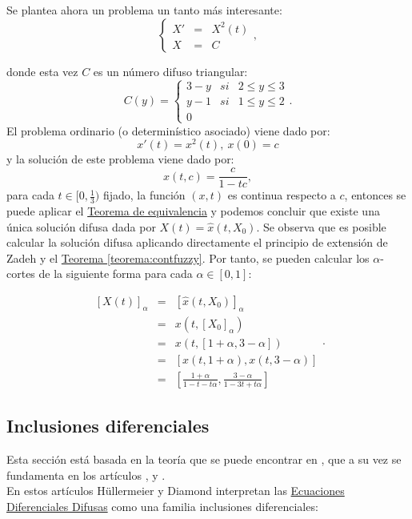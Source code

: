 \begin{ejemplo}
	Se plantea ahora un problema un tanto más interesante:
	\[
		\left\{
			\begin{array}{ccc}
				X' & = & X^2(t) \\
				X & =  & C
			\end{array}
		\right.,
	\]
	
	donde esta vez $C$ es un número difuso triangular:
	\[
		C(y) = \left\{
			\begin{array}{ccc}
				3 - y & si & 2 \leq y \leq 3 \\
				y - 1 & si & 1 \leq y \leq 2 \\
				0 
			\end{array}
		\right. .
	\]
	El problema ordinario (o determinístico asociado) viene dado por:
	\[
		x'(t) = x^2(t), ~ x(0) = c
	\]
	y la solución de este problema viene dado por:
	\[
		x(t, c) = \frac{c}{1-tc},
	\]
	para cada $t \in [0, \frac{1}{3})$ fijado, la función $(x, t)$ es continua respecto a $c$, entonces se puede aplicar el \hyperref[teorema:equivalencia]{Teorema de equivalencia} y podemos concluir que existe una única solución difusa dada por $X(t) = \hat{x}(t, X_0)$. Se observa que es posible calcular la solución difusa aplicando directamente el principio de extensión de Zadeh y el \hyperref[teorema:contfuzzy]{Teorema \ref*{teorema:contfuzzy}}. Por tanto, se pueden calcular los $\alpha$-cortes de la siguiente forma para cada $\alpha \in [0, 1]$:
	
	\[
		\begin{array}{ccc}
			[X(t)]_\alpha & = & [\hat{x}(t, X_0)]_\alpha \\
			& = & x(t, [X_0]_\alpha) \\
			& = & x(t, [1+\alpha, 3-\alpha]) \\
			& = & [x(t, 1+\alpha), x(t, 3-\alpha)] \\
			& = & \left[
				\frac{1+\alpha}{1-t-t\alpha}, \frac{3-\alpha}{1-3t + t\alpha}
			\right]
		\end{array}.
	\]
\end{ejemplo}

\subsection{Inclusiones diferenciales}
Esta sección está basada en la teoría que se puede encontrar en \cite{fuzzyintro}, que a su vez se fundamenta en los artículos  \cite{inclusionesdif1}, \cite{inclusionesdif2} y \cite{inclusionesdif3}.\\
En estos artículos Hüllermeier y Diamond interpretan las  \hyperref[def:edf]{Ecuaciones Diferenciales Difusas} como una familia inclusiones diferenciales:

